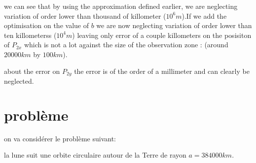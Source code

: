 \documentclass{article} %
\begin{document}
		
		we can see that by using the approximation defined earlier, we are neglecting variation of order lower than thousand of killometer ($10^6 m$).If we add the optimisation on the value of $b$ we are now neglecting variation of order lower than ten killometerss ($10^4 m$) leaving only error of a couple killometers on the  posisiton of $P_{2x}$ which is not a lot against the size of the observation zone : (around $ 20000 km $ by $100 km$).
		
		about the error on $P_{2y}$ the error is of the order of a millimeter and can clearly be neglected.
		
		
		
		
		
		
		\section{problème}
		
		on va considérer le problème suivant:
		
		la lune suit une orbite circulaire autour de la Terre de rayon $a=384000km$.
		
\end{document}

